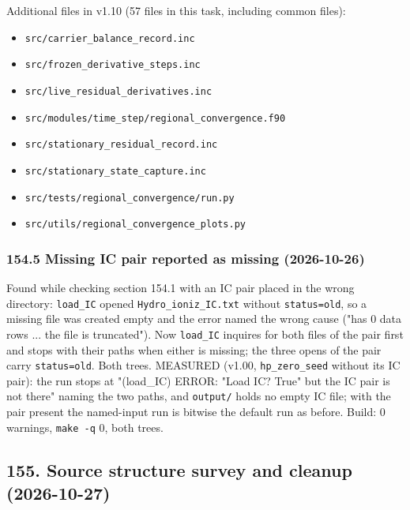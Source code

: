 \documentclass[english,a4paper]{my_memo}
\providecommand{\tightlist}{\setlength{\itemsep}{0pt}\setlength{\parskip}{0pt}}
\begin{document}
Additional files in v1.10 (57 files in this task, including common files):

\begin{itemize}
\tightlist
\item
  \texttt{src/carrier\_balance\_record.inc}
\item
  \texttt{src/frozen\_derivative\_steps.inc}
\item
  \texttt{src/live\_residual\_derivatives.inc}
\item
  \texttt{src/modules/time\_step/regional\_convergence.f90}
\item
  \texttt{src/stationary\_residual\_record.inc}
\item
  \texttt{src/stationary\_state\_capture.inc}
\item
  \texttt{src/tests/regional\_convergence/run.py}
\item
  \texttt{src/utils/regional\_convergence\_plots.py}
\end{itemize}

\subsubsection{154.5 Missing IC pair reported as missing (2026-10-26)}\label{1545-missing-ic-pair-reported-as-missing-2026-10-26}

Found while checking section 154.1 with an IC pair placed in the wrong
directory: \texttt{load\_IC} opened \texttt{Hydro\_ioniz\_IC.txt} without \texttt{status=\textquotesingle{}old\textquotesingle{}},
so a missing file was created empty and the error named the wrong cause
("has 0 data rows ... the file is truncated"). Now \texttt{load\_IC} inquires for
both files of the pair first and stops with their paths when either is
missing; the three opens of the pair carry \texttt{status=\textquotesingle{}old\textquotesingle{}}. Both trees.
MEASURED (v1.00, \texttt{hp\_zero\_seed} without its IC pair): the run stops at
"(load\_IC) ERROR: "Load IC? True" but the IC pair is not there" naming the
two paths, and \texttt{output/} holds no empty IC file; with the pair present the
named-input run is bitwise the default run as before. Build: 0 warnings,
\texttt{make\ -q} 0, both trees.

\subsection{155. Source structure survey and cleanup (2026-10-27)}\label{155-source-structure-survey-and-cleanup-2026-10-27}
\end{document}
